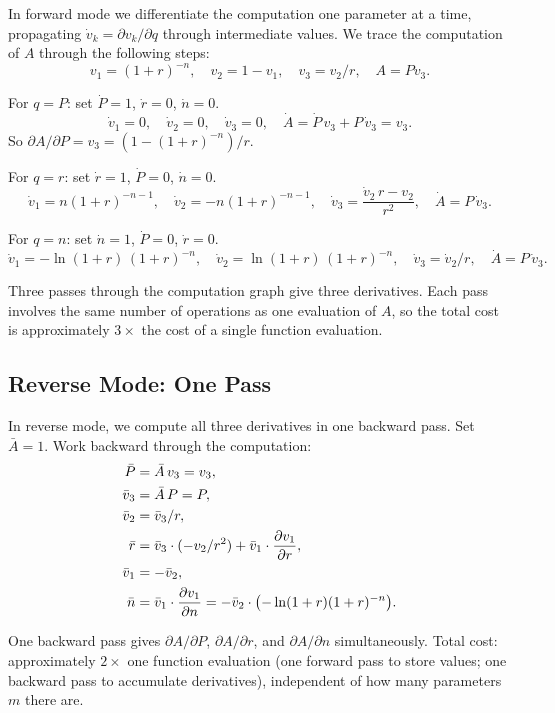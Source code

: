 In forward mode we differentiate the computation one parameter at a time,
propagating $\dot{v}_k = \partial v_k/\partial q$ through intermediate
values. We trace the computation of $A$ through the following steps:
\[
  v_1 = (1+r)^{-n}, \quad
  v_2 = 1 - v_1, \quad
  v_3 = v_2/r, \quad
  A = P v_3.
\]

For $q = P$: set $\dot{P} = 1$, $\dot{r} = 0$, $\dot{n} = 0$.
\[
  \dot{v}_1 = 0, \quad \dot{v}_2 = 0, \quad \dot{v}_3 = 0, \quad
  \dot{A} = \dot{P}\,v_3 + P\,\dot{v}_3 = v_3.
\]
So $\partial A/\partial P = v_3 = (1-(1+r)^{-n})/r$.

For $q = r$: set $\dot{r} = 1$, $\dot{P} = 0$, $\dot{n} = 0$.
\[
  \dot{v}_1 = n(1+r)^{-n-1}, \quad
  \dot{v}_2 = -n(1+r)^{-n-1}, \quad
  \dot{v}_3 = \frac{\dot{v}_2\,r - v_2}{r^2}, \quad
  \dot{A} = P\,\dot{v}_3.
\]

For $q = n$: set $\dot{n} = 1$, $\dot{P} = 0$, $\dot{r} = 0$.
\[
  \dot{v}_1 = -\ln(1+r)\,(1+r)^{-n}, \quad
  \dot{v}_2 = \ln(1+r)\,(1+r)^{-n}, \quad
  \dot{v}_3 = \dot{v}_2/r, \quad
  \dot{A} = P\,\dot{v}_3.
\]

Three passes through the computation graph give three derivatives.
Each pass involves the same number of operations as one evaluation
of $A$, so the total cost is approximately $3\times$ the cost
of a single function evaluation.

\subsection{Reverse Mode: One Pass}

In reverse mode, we compute all three derivatives in one backward
pass. Set $\bar{A} = 1$. Work backward through the computation:
\begin{align*}
  \bar{P}  &= \bar{A}\,v_3 = v_3, \\
  \bar{v}_3 &= \bar{A}\,P = P, \\
  \bar{v}_2 &= \bar{v}_3 / r, \\
  \bar{r}   &= \bar{v}_3 \cdot (-v_2/r^2) + \bar{v}_1\cdot\frac{\partial v_1}{\partial r}, \\
  \bar{v}_1 &= -\bar{v}_2, \\
  \bar{n}   &= \bar{v}_1 \cdot \frac{\partial v_1}{\partial n}
             = -\bar{v}_2 \cdot \bigl(-\ln(1+r)(1+r)^{-n}\bigr).
\end{align*}

One backward pass gives $\partial A/\partial P$, $\partial A/\partial r$,
and $\partial A/\partial n$ simultaneously. Total cost: approximately
$2\times$ one function evaluation (one forward pass to store values;
one backward pass to accumulate derivatives), independent of
how many parameters $m$ there are.

